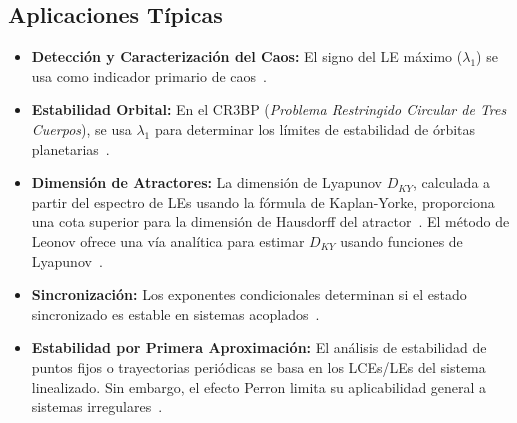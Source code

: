 \subsection{Aplicaciones Típicas}
\begin{itemize}
    \item \textbf{Detección y Caracterización del Caos:} El signo del LE máximo ($\lambda_1$) se usa como indicador primario de caos~\cite{Quarles2011}.
    \item \textbf{Estabilidad Orbital:} En el CR3BP (\textit{Problema Restringido Circular de Tres Cuerpos}), se usa $\lambda_1$ para determinar los límites de estabilidad de órbitas planetarias~\cite{Quarles2011}.
    \item \textbf{Dimensión de Atractores:} La dimensión de Lyapunov $D_{KY}$, calculada a partir del espectro de LEs usando la fórmula de Kaplan-Yorke, proporciona una cota superior para la dimensión de Hausdorff del atractor~\cite{Kuznetsov2016, Kuznetsov_2016}. El método de Leonov ofrece una vía analítica para estimar $D_{KY}$ usando funciones de Lyapunov~\cite{Kuznetsov_2016}.
    \item \textbf{Sincronización:} Los exponentes condicionales determinan si el estado sincronizado es estable en sistemas acoplados~\cite{Pecora1997}.
    \item \textbf{Estabilidad por Primera Aproximación:} El análisis de estabilidad de puntos fijos o trayectorias periódicas se basa en los LCEs/LEs del sistema linealizado. Sin embargo, el efecto Perron limita su aplicabilidad general a sistemas irregulares~\cite{Leonov2007, Kuznetsov2005}.
\end{itemize}

